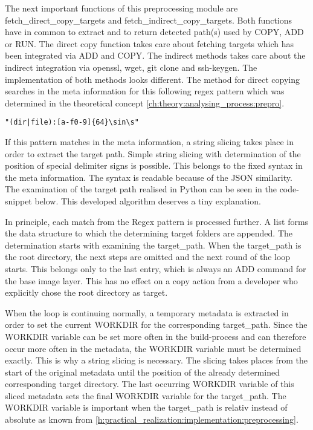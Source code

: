 The next important functions of this preprocessing module are fetch\_direct\_copy\_targets and fetch\_indirect\_copy\_targets. Both functions have in common to extract and to return detected path(s) used by COPY, ADD or RUN. The direct copy function takes care about fetching targets which has been integrated via ADD and COPY. The indirect methods takes care about the indirect integration via openssl, wget, git clone and ssh-keygen. The implementation of both methods looks different.
The method for direct copying searches in the meta information for this following regex pattern which was determined in the theoretical concept \ref{ch:theory:analysing_process:prepro}.
\begin{lstlisting}
"(dir|file):[a-f0-9]{64}\sin\s"
\end{lstlisting}
If this pattern matches in the meta information, a string slicing takes place in order to extract the target path. Simple string slicing with determination of the position of special delimiter signs is possible. This belongs to the fixed syntax in the meta information. The syntax is readable because of the JSON similarity.
The examination of the target path realised in Python can be seen in the code-snippet below.
This developed algorithm deserves a tiny explanation.

In principle, each match from the Regex pattern is processed further. A list forms the data structure to which the determining target folders are appended. The determination starts with examining the target\_path. 
When the target\_path is the root directory, the next steps are omitted and the next round of the loop starts. This belongs only to the last entry, which is always an ADD command for the base image layer. This has no effect on a copy action from a developer who explicitly chose the root directory as target.

When the loop is continuing normally, a temporary metadata is extracted in order to set the current WORKDIR for the corresponding target\_path. Since the WORKDIR variable can be set more often in the build-process and can therefore occur more often in the metadata, the WORKDIR variable must be determined exactly. This is why a string slicing is necessary. The slicing takes places from the start of the original metadata until the position of the already determined corresponding target directory. 
The last occurring WORKDIR variable of this sliced metadata sets the final WORKDIR variable for the target\_path. The WORKDIR variable is important when the target\_path is relativ instead of absolute as known from \ref{h:practical_realization:implementation:preprocessing}.

